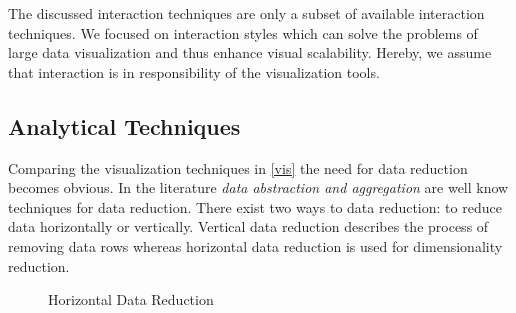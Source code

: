 The discussed interaction techniques are only a subset of available interaction techniques. We focused on interaction styles which can solve the problems of large data visualization and thus enhance visual scalability\cite{Tegarden1999}. Hereby, we assume that interaction is in responsibility of the visualization tools.

\subsection{Analytical Techniques}\label{analytical}
Comparing the visualization techniques in \ref{vis} the need for data reduction becomes obvious. In the literature \textit{data abstraction and aggregation} are well know techniques for data reduction\cite{FerreiradeOliveira2003,Aigner2011, Keim2005}. There exist two ways to data reduction: to reduce data horizontally or vertically. 
Vertical data reduction describes the process of removing data rows whereas horizontal data reduction is used for dimensionality reduction. 
\begin{figure}[H]
    \centering
    \caption{Horizontal Data Reduction}
    \label{fig:my_label}
\end{figure}


